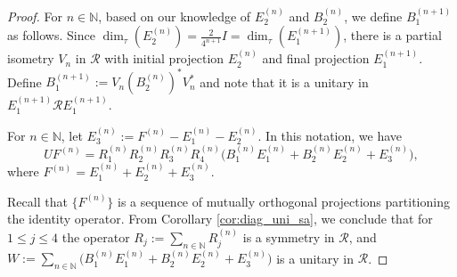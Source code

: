 \documentclass[12pt, preprint]{amsart}
\newcommand{\N}{\mathbb{N}}
\theoremstyle{definition}
\theoremstyle{remark}
\numberwithin{equation}{section}
\theoremstyle{ser}
\theoremstyle{serr}
\theoremstyle{ser}
\begin{document}
\begin{proof}
For $n \in \N$, based on our knowledge of $E_2 ^{(n)}$ and $B_2 ^{(n)}$, we define $B_1^{(n+1)}$ as follows. Since $\dim _{\tau} (E_2 ^{(n)}) = \frac{2}{4^{n+1}} I = \dim _{\tau} (E_1 ^{(n+1)})$, there is a partial isometry $V_n$ in $\mathscr{R}$ with initial projection $E_2^{(n)}$ and final projection $E_1 ^{(n+1)}$. Define $B_1^{(n+1)} := V_n (B_2 ^{(n)}) ^* V_n^*$ and note that it is a unitary in $E_1 ^{(n+1)} \mathscr{R} E_1 ^{(n+1)}$. 

For $n \in \N$, let $E_3^{(n)} := F^{(n)} - E_1 ^{(n)} - E_2^{(n)}$. In this notation, we have $$UF^{(n)} = R_1^{(n)} R_2^{(n)} R_3^{(n)} R_4^{(n)} \big( B_1 ^{(n)} E_1^{(n)} + B_2^{(n)}E_2^{(n)} + E_3 ^{(n)} \big),$$
where $F^{(n)} = E_1 ^{(n)} + E_2^{(n)} + E_3 ^{(n)}$.

Recall that $\{F^{(n)}\}$ is a sequence of mutually orthogonal projections partitioning the identity operator. From Corollary \ref{cor:diag_uni_sa}, we conclude that for $1 \le j \le 4$ the operator $R_j := \sum_{n \in \N} R_j ^{(n)}$ is a symmetry in $\mathscr{R}$, and $W := \sum_{n \in \N} \big( B_1 ^{(n)} E_1^{(n)} +  B_2^{(n)}E_2^{(n)} + E_3^{(n)} \big)$ is a unitary in $\mathscr{R}$.




\end{proof}
\end{document}
